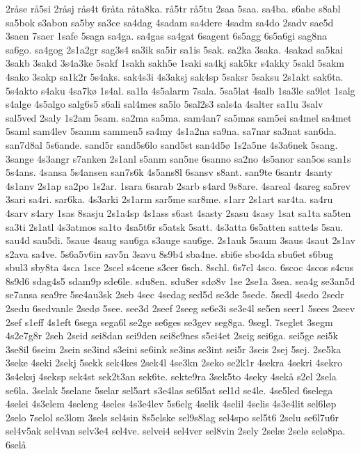 2r^^e5se
r^^e55si
2r^^e5sj
r^^e5s4t
6r^^e5ta
r^^e5ta8ka.
r^^e55tr
r^^e55tu
2saa
5saa.
sa4ba.
s6abe
s8abl
sa5bok
s3abon
sa5by
sa3ce
sa4dag
4sadam
sa4dere
4sadm
sa4do
2sadv
sae5d
3saen
7saer
1safe
5saga
sa4ga.
sa4gas
sa4gat
6sagent
6s5agg
6s5a6gi
sag8na
sa6go.
sa4gog
2s1a2gr
sag3s4
sa3ik
sa5ir
sa1is
5sak.
sa2ka
3saka.
4sakad
sa5kai
3sakb
3sakd
3s4a3ke
5sakf
1sakh
sakh5e
1saki
sa4kj
sak5kr
s4akky
5sakl
5sakm
4sako
3sakp
sa1k2r
5s4aks.
sak4s3i
4s3aksj
sak4sp
5saksr
5saksu
2s1akt
sak6ta.
5s4akto
s4aku
4sa7k^^f8
1s4al.
sa1la
4s5alarm
7sala.
5sa5lat
4salb
1sa3le
sa9let
1salg
s4alge
4s5algo
salg6s5
s6ali
sal4mes
sa5lo
5sal2s3
sals4a
4salter
sa1lu
3salv
sal5ved
2saly
1s2am
5sam.
sa2ma
sa5ma.
sam4an7
sa5mas
sam5ei
sa4mel
sa4met
5saml
sam4lev
5samm
sammen5
sa4my
4s1a2na
sa9na.
sa7nar
sa3nat
san6da.
san7d8al
5s6ande.
sand5r
sand5s6lo
sand5st
san4d5^^f8
1s2a5ne
4s3a6nek
5sang.
3sange
4s3angr
s7anken
2s1anl
s5anm
san5ne
6sanno
sa2no
4s5anor
san5os
san1s
5s4ans.
4sansa
5s4ansen
san7s6k
4s5ans8l
6sansv
s8ant.
san9te
6santr
4santy
4s1anv
2s1ap
sa2po
1s2ar.
1sara
6sarab
2sarb
s4ard
9s8are.
4sareal
4sareg
sa5rev
3sari
sa4ri.
sar6ka.
4s3arki
2s1arm
sar5me
sar8me.
s1arr
2s1art
sar4ta.
sa4ru
4sarv
s4ary
1sas
8sasju
2s1a4sp
4s1ass
s6ast
4sasty
2sasu
4sasy
1sat
sa1ta
sa5ten
sa3ti
2s1atl
4s3atmos
sa1to
4sa5t6r
s5atsk
5satt.
4s3atta
6s5atten
satte4s
5sau.
sau4d
sau5di.
5saue
4saug
sau6ga
s3auge
sau6ge.
2s1auk
5saum
3saus
4saut
2s1av
s2ava
sa4ve.
5s6a5v6in
sav5n
3savu
8s9b4
sba4ne.
sbi6e
sbo4da
sbu6et
s6bug
sbul3
sby8ta
4sca
1sce
2scel
s4cene
s3cer
6sch.
8schl.
6s7cl
4sco.
6scoc
4scos
s4cus
8s9d6
sdag4s5
sdam9p
sde6le.
sdu8en.
sdu8er
sd^^f88v
1se
2se1a
3sea.
sea4g
se3an5d 
se7ansa
sea9re
5se4au3sk
2seb
4sec
4sedag
sed5d
se3de
5sede.
5sedl
4sedo
2sedr
2sedu
6sedvanle
2sed^^f8
5see.
see3d
2seef
2seeg
se6e3i
se3e4l
se5en
seer1
5sees
2seev
2sef
s1eff
4s1eft
6sega
sega6l
se2ge
se6ges
se3gev
seg8ga.
9segl.
7seglet
3segm
4s2e7g8r
2seh
2seid
sei8dan
sei9den
sei8e9nes
s5ei4et
2seig
sei6ga.
sei5ge
sei5k
3se8il
6seim
2sein
se3ind
s3eini
se6ink
se3ins
se3int
sei5r
3seis
2sej
5sej.
2se5ka
3seke
4seki
2sekj
5sekk
sek4kes
2sek4l
4se3kn
2seko
se2k1r
4sekra
4sekri
4sekro
3s4eksj
4seksp
sek4st
sek2t3an
sek6te.
sekte9ra
3sek5to
4seky
4sek^^e5
s2el
2sela
se6la.
3selak
5selane
5selar
sel5art
s3e4las
se6l5at
sel1d
se4le.
4se5led
6selega
4selei
4s3elem
4seleng
4seles
4s3e4lev
5s6elg
4selik
4selil
4selis
4s3e4lit
sel6l^^f8p
2selo
7selol
se3lom
3sels
sel4sin
8s5elske
sel9s8lag
sel4spo
sel5t6
2selu
se6l7u6r
sel4v5ak
sel4van
selv3e4
sel4ve.
selvei4
sel4ver
sel8vin
2sely
2sel^^e6
2sel^^f8
sel^^f88pa.
6sel^^e5
